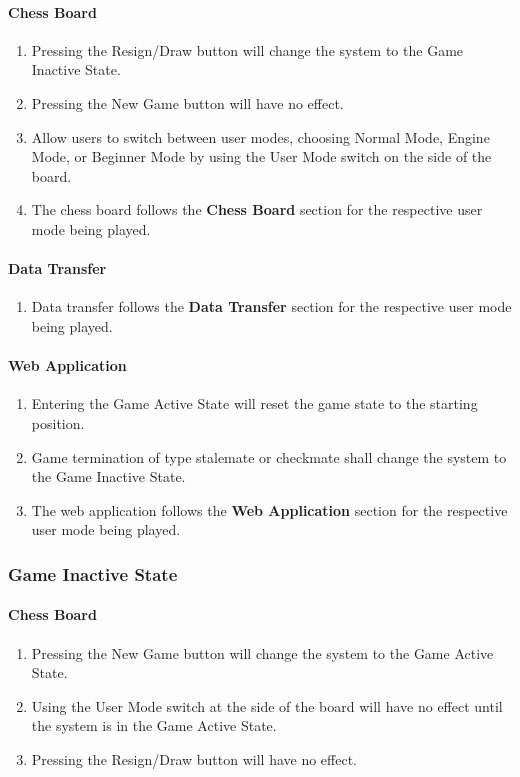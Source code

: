 \documentclass[12pt]{article}
\begin{document}
{\paragraph{Chess Board}
\begin{enumerate}[{GA}1., leftmargin=2\parindent]
    \item Pressing the Resign/Draw button will change the system to the Game Inactive State.
    \item Pressing the New Game button will have no effect.
    \item Allow users to switch between user modes, choosing Normal Mode, Engine Mode, or Beginner Mode by using the User Mode switch on the side of the board.
    \item The chess board follows the \textbf{Chess Board} section for the respective user mode being played.
\end{enumerate}

\paragraph{Data Transfer}
\begin{enumerate}[{GA}1., leftmargin=2\parindent, resume]
    \item Data transfer follows the \textbf{Data Transfer} section for the respective user mode being played.
\end{enumerate}

\paragraph{Web Application}
\begin{enumerate}[{GA}1., leftmargin=2\parindent, resume]
    \item Entering the Game Active State will reset the game state to the starting position.
    \item Game termination of type stalemate or checkmate shall change the system to the Game Inactive State.
    \item The web application follows the \textbf{Web Application} section for the respective user mode being played.
\end{enumerate}

\subsubsection{Game Inactive State}
\paragraph{Chess Board}
\begin{enumerate}[{GI}1., leftmargin=2\parindent]
    \item Pressing the New Game button will change the system to the Game Active State.
    \item Using the User Mode switch at the side of the board will have no effect until the system is in the Game Active State.
    \item Pressing the Resign/Draw button will have no effect.
\end{enumerate}

}
\end{document}

